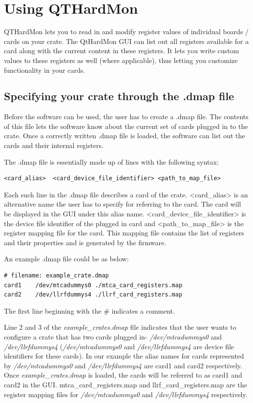 \chapter{Using QTHardMon}

QTHardMon lets you to read in and modify register values of individual boards / cards on your crate. The QtHardMon GUI can list out all registers available for a card along with the current content in these registers. It lets you write custom values to these registers as well (where applicable), thus letting you customize functionality in your cards.

\section{Specifying your crate through the .dmap file}
Before the software can be used, the user has to create a .dmap file. The contents of this file lets the software know about the current set of cards plugged in to the crate. Once a correctly written .dmap file is loaded, the software can list out the cards and their internal registers. 

The .dmap file is essentially made up of lines with the following syntax:
\begin{lstlisting}
<card_alias>  <card_device_file_identifier> <path_to_map_file>
\end{lstlisting}

Each such line in the .dmap file describes a card of the crate.
\mbox{\textless card\_alias\textgreater}  is an alternative name the user has to specify for referring to the card. The card will be displayed in the GUI under this alias name.
\mbox{\textless card\_device\_file\_identifier\textgreater} is the device file identifier of the plugged in card and \mbox{\textless path\_to\_map\_file\textgreater} is the register mapping file for the card. This mapping file contains the list of registers and their properties and is generated by the firmware.
	

An example .dmap file could be as below:
\begin{lstlisting}
# filename: example_crate.dmap
card1    /dev/mtcadummys0 ./mtca_card_registers.map
card2    /dev/llrfdummys4 ./llrf_card_registers.map
\end{lstlisting}


The first line beginning with the \# indicates a comment. 

Line 2 and 3  of the \textit{example\_crates.dmap} file indicates that the user wants to configure a crate that has two cards plugged in- \textit{/dev/mtcadummys0} and \textit{/dev/llrfdummys4} (\textit{/dev/mtcadummys0} and \textit{/dev/llrfdummys4} are device file identifiers for these cards).  In our example the alias names for cards represented by \textit{/dev/mtcadummys0} and \textit{/dev/llrfdummys4} are card1 and card2 respectively. Once \textit{example\_crates.dmap} is loaded, the cards will be referred to as card1 and card2 in the GUI.
mtca\_card\_registers.map and llrf\_card\_registers.map are the register mapping files for \textit{/dev/mtcadummys0} and \textit{/dev/llrfdummys4} respectively. 


